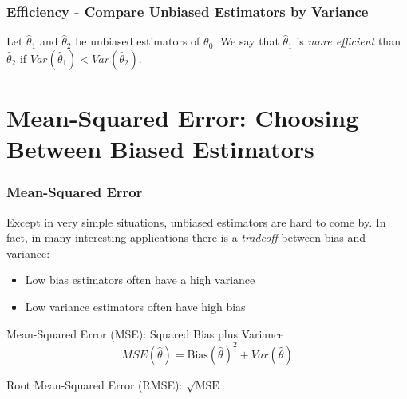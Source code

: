 \begin{frame}
\frametitle{Efficiency - Compare Unbiased Estimators by Variance}
Let $\widehat{\theta}_1$ and $\widehat{\theta}_2$ be unbiased estimators of $\theta_0$. We say that $\widehat{\theta}_1$ is \alert{\emph{more efficient}} than $\widehat{\theta}_2$ if $Var(\widehat{\theta}_1)<Var(\widehat{\theta}_2)$.
\end{frame}

\section{Mean-Squared Error: Choosing Between Biased Estimators}
\begin{frame}
\frametitle{Mean-Squared Error}
Except in very simple situations, unbiased estimators are hard to come by. In fact, in many interesting applications there is a \alert{\emph{tradeoff}} between \alert{bias} and \alert{variance}:
\begin{itemize}
\item Low bias estimators often have a high variance 
\item Low variance estimators often have high bias
\end{itemize}
\pause
\vspace{1em}
\alert{Mean-Squared Error (MSE):}   Squared Bias plus Variance
$$ MSE(\widehat{\theta}) = \mbox{Bias}(\widehat{\theta})^2 + Var(\widehat{\theta})$$ 

\alert{Root Mean-Squared Error (RMSE):} $\sqrt{\mbox{MSE}}$  

\end{frame}
